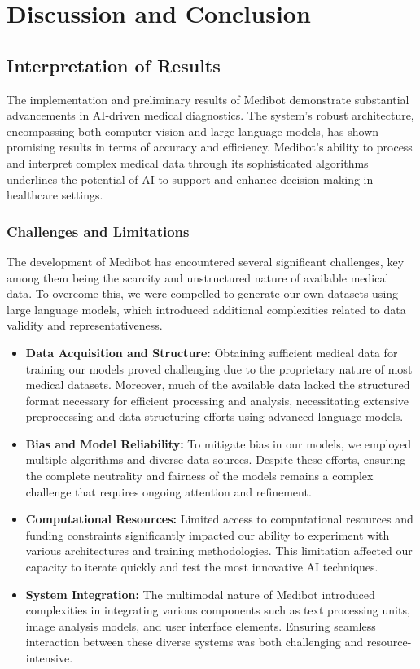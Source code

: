 \chapter{Discussion and Conclusion}

\section{Interpretation of Results}
The implementation and preliminary results of Medibot demonstrate substantial advancements in AI-driven medical diagnostics. The system's robust architecture, encompassing both computer vision and large language models, has shown promising results in terms of accuracy and efficiency. Medibot’s ability to process and interpret complex medical data through its sophisticated algorithms underlines the potential of AI to support and enhance decision-making in healthcare settings.

\subsection{Challenges and Limitations}
The development of Medibot has encountered several significant challenges, key among them being the scarcity and unstructured nature of available medical data. To overcome this, we were compelled to generate our own datasets using large language models, which introduced additional complexities related to data validity and representativeness.

\begin{itemize}
    \item \textbf{Data Acquisition and Structure:} Obtaining sufficient medical data for training our models proved challenging due to the proprietary nature of most medical datasets. Moreover, much of the available data lacked the structured format necessary for efficient processing and analysis, necessitating extensive preprocessing and data structuring efforts using advanced language models.
    \item \textbf{Bias and Model Reliability:} To mitigate bias in our models, we employed multiple algorithms and diverse data sources. Despite these efforts, ensuring the complete neutrality and fairness of the models remains a complex challenge that requires ongoing attention and refinement.
    \item \textbf{Computational Resources:} Limited access to computational resources and funding constraints significantly impacted our ability to experiment with various architectures and training methodologies. This limitation affected our capacity to iterate quickly and test the most innovative AI techniques.
    \item \textbf{System Integration:} The multimodal nature of Medibot introduced complexities in integrating various components such as text processing units, image analysis models, and user interface elements. Ensuring seamless interaction between these diverse systems was both challenging and resource-intensive.
\end{itemize}

